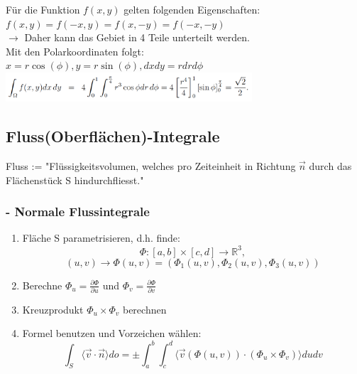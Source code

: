\documentclass[6pt]{article}
\begin{document}
\begin{multicols*}{3}
				F{\"u}r die Funktion $f(x,y)$ gelten folgenden Eigenschaften: $f(x,y) = f(-x,y) = f(x,-y)= f(-x,-y)$\\
				 $\rightarrow$ Daher kann das Gebiet in 4 Teile unterteilt werden.  \vspace{-2mm}\\
				 
				 Mit den Polarkoordinaten folgt:\\
				  $x=r\cos(\phi), y=r\sin(\phi), dxdy=r dr d\phi$\\
 				
				\vspace{-3mm}
				\includegraphics[width=260pt]{images/Flaechenintegral2}
				
						\pagebreak
		\subsection*{Fluss(Oberfl{\"a}chen)-Integrale}
		
		Fluss := "Fl{\"u}ssigkeitsvolumen, welches pro Zeiteinheit in Richtung $\vec{n}$ durch das Fl{\"a}chenst{\"u}ck S hindurchfliesst."
		
		\subsubsection*{- Normale Flussintegrale}

		\begin{enumerate}
			\item Fl{\"a}che S parametrisieren, d.h. finde:
						\[
								\Phi: [a,b] \times [c,d] \rightarrow \mathbb{R}^3, 
						\]
						\[
								(u,v) \rightarrow \Phi(u,v) = (\Phi_1(u,v), \Phi_2(u,v), \Phi_3(u,v))
						\]
			\item Berechne $\Phi_u = \frac{\partial \Phi}{\partial u}$ und $\Phi_v = \frac{\partial \Phi}{\partial v}$
			\item Kreuzprodukt $\Phi_u \times \Phi_v$ berechnen
			\item Formel benutzen und Vorzeichen w{\"a}hlen:
						\[
								\int_{S} \langle \vec{v} \cdot \vec{n} \rangle do = \pm \int_{a}^{b} \int_{c}^{d} \langle\vec{v}(\Phi(u,v)) \cdot (\Phi_u \times \Phi_v)\rangle dudv
						\]
		\end{enumerate}
		

\end{multicols*}
\end{document}
